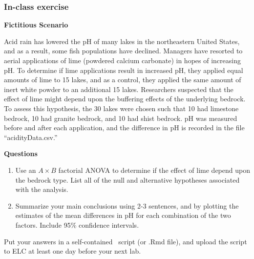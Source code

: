 \documentclass[color=usenames,dvipsnames]{beamer}\usepackage[]{graphicx}\usepackage[]{color}
\newcommand{\inr}[1]{\colorbox{inlinecolor}{\texttt{#1}}}
\begin{document}
\begin{frame}
  \frametitle{In-class exercise}
\scriptsize %

{\bf Fictitious Scenario \par}
Acid rain has lowered the pH of many lakes in the northeastern United
States, and as a result, some fish populations have declined. Managers
have resorted to aerial applications of lime (powdered calcium
carbonate) in hopes of increasing pH. To determine if lime
applications result in increased pH, they applied equal amounts of
lime to 15 lakes, and as a control, they applied the same amount of
inert white powder to an additional 15 lakes. Researchers suspected
that the effect of lime might depend upon the buffering effects of the
underlying bedrock. To assess this hypothesis, the 30 lakes were
chosen such that 10 had limestone bedrock, 10 had granite bedrock, and
10 had shist bedrock. pH was measured before and after each
application, and the difference in pH is recorded in the file
``acidityData.csv.'' \par 
\pause
\vfill
{\bf Questions}
\begin{enumerate}[{\bf 1}]
  \item Use an $A \times B$ factorial ANOVA to determine if the effect
    of lime depend upon the bedrock type. List all of the null and
    alternative hypotheses associated with the analysis.
  \item Summarize your main conclusions using 2-3 sentences, and by
    plotting the estimates of the mean differences in pH for each
    combination of the two factors. Include 95\% confidence intervals.
\end{enumerate}
\pause
\vfill
Put your answers in a self-contained \R~script (or .Rmd file), and
upload the script to ELC at least one day before your next lab.
\end{frame}
\end{document}
